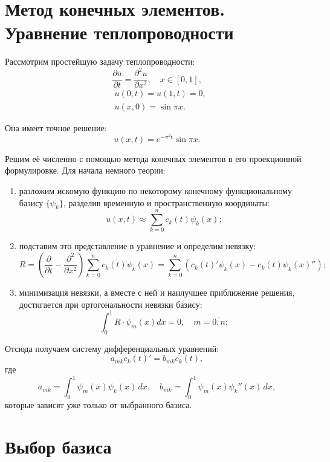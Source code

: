 \documentclass[a4paper,12pt]{article}
\begin{document}
	\section{Метод конечных элементов. Уравнение теплопроводности}
	Рассмотрим простейшую задачу теплопроводности:
	\[
		\frac{\partial u}{\partial t} = \frac{\partial^2 u}{\partial x^2},
		\quad x \in [0, 1],
	\]
	\begin{align*}
		& u(0, t) = u(1, t) = 0,\\
		& u(x, 0) = \sin \pi x.
	\end{align*}

	Она имеет точное решение:
	\[
		u(x, t) = e^{-\pi^2 t}\sin\pi x.
	\]

	Решим её численно с помощью метода конечных элементов в его проекционной
	формулировке. Для начала немного теории:
	\begin{enumerate}
		\item разложим искомую функцию по некоторому конечному функциональному
			  базису \( \{\psi_k\} \), разделив временную и пространственную
			  координаты:
			  \[ u(x, t) \approx \sum_{k=0}^n c_k(t)\psi_k(x); \]
		\item подставим это представление в уравнение и определим невязку:
			  \[
			  	R = \left(\frac{\partial}{\partial t} -
			  		\frac{\partial^2}{\partial x^2}\right)
			  		\sum_{k=0}^n c_k(t)\psi_k(x) =
			  		\sum_{k=0}^n
			  		\left(c_k(t)'\psi_k(x) - c_k(t)\psi_k(x)''\right);
			  \]
		\item минимизация невязки, а вместе с ней и наилучшее приближение
			  решения, достигается при ортогональности невязки базису:
			  \[
			  	\int_0^1 R\cdot\psi_m(x) dx = 0,\quad m = \overline{0, n};
			  \]
	\end{enumerate}

	Отсюда получаем систему дифференциальных уравнений:
	\[
		a_{mk}c_k(t)' = b_{mk}c_k(t),
	\]
	где
	\[
		a_{mk} = \int_0^1 \psi_m(x) \psi_k(x) \,dx,\quad
		b_{mk} = \int_0^1 \psi_m(x) \psi_k''(x) \,dx,
	\]
	которые зависят уже только от выбранного базиса.

	\section{Выбор базиса}
\end{document}
